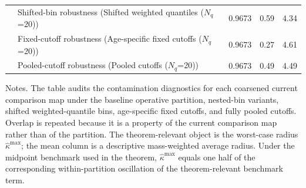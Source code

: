 \begin{table}[t]
{\begin{tabular}{>{\raggedright\arraybackslash}p{}>{\raggedright\arraybackslash}p{}ccc}
 & Shifted-bin robustness (Shifted weighted quantiles ($N_q$=20)) & 0.9673 & 0.59 & 4.34 \\
 & Fixed-cutoff robustness (Age-specific fixed cutoffs ($N_q$=20)) & 0.9673 & 0.27 & 4.61 \\
 & Pooled-cutoff robustness (Pooled cutoffs ($N_q$=20)) & 0.9673 & 0.49 & 4.49 \\
\bottomrule
\end{tabular}%
}
\begin{minipage}{0.97\textwidth}
\footnotesize Notes. The table audits the contamination diagnostics for each coarsened current comparison map under the baseline operative partition, nested-bin variants, shifted weighted-quantile bins, age-specific fixed cutoffs, and fully pooled cutoffs. Overlap is repeated because it is a property of the current comparison map rather than of the partition. The theorem-relevant object is the worst-case radius $\hat\kappa^{\max}$; the mean column is a descriptive mass-weighted average radius. Under the midpoint benchmark used in the theorem, $\hat\kappa^{\max}$ equals one half of the corresponding within-partition oscillation of the theorem-relevant benchmark term.
\end{minipage}
\end{table}
